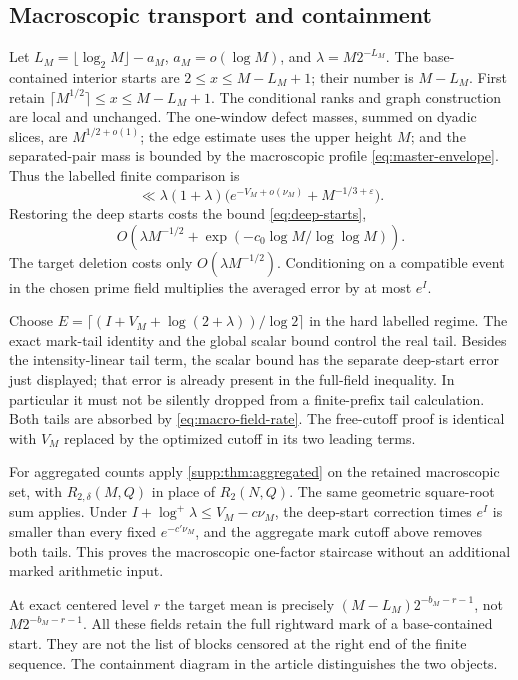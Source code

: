 \subsection{Macroscopic transport and containment}\label{supp:sec:macro-marked}
Let $L_M=\lfloor\log_2M\rfloor-a_M$, $a_M=o(\log M)$, and
$\lambda=M2^{-L_M}$. The base-contained interior starts are
$2\le x\le M-L_M+1$; their number is $M-L_M$.
First retain $\lceil M^{1/2}\rceil\le x\le M-L_M+1$.
The conditional ranks and graph construction are local and unchanged.
The one-window defect masses, summed on dyadic slices, are
$M^{1/2+o(1)}$; the edge estimate uses the upper height $M$; and the
separated-pair mass is bounded by the macroscopic profile
\eqref{eq:master-envelope}. Thus the labelled finite comparison is
\[
 \ll\lambda(1+\lambda)
             \bigl(e^{-V_M+o(\nu_M)}+M^{-1/3+\varepsilon}\bigr).
\]
Restoring the deep starts costs the bound \eqref{eq:deep-starts},
\[
 O\left(\lambda M^{-1/2}
             +\exp(-c_0\log M/\log\log M)\right).
\]
The target deletion costs only $O(\lambda M^{-1/2})$.
Conditioning on a compatible event in the chosen prime field multiplies
the averaged error by at most $e^I$.

Choose $E=\lceil(I+V_M+\log(2+\lambda))/\log2\rceil$ in the hard
labelled regime. The exact mark-tail identity and the global scalar
bound control the real tail. Besides the intensity-linear tail term,
the scalar bound has the separate deep-start error just displayed;
that error is already present in the full-field inequality. In
particular it must not be silently dropped from a finite-prefix tail
calculation. Both tails are absorbed by
\eqref{eq:macro-field-rate}. The free-cutoff proof is identical with
$V_M$ replaced by the optimized cutoff in its two leading terms.

For aggregated counts apply \cref{supp:thm:aggregated} on the retained
macroscopic set, with $R_{2,\delta}(M,Q)$ in place of $R_2(N,Q)$.
The same geometric square-root sum applies. Under
$I+\log^+\lambda\le V_M-c\nu_M$, the deep-start correction times
$e^I$ is smaller than every fixed $e^{-c'\nu_M}$, and the aggregate
mark cutoff above removes both tails. This proves the macroscopic
one-factor staircase without an additional marked arithmetic input.

At exact centered level $r$ the target mean is precisely
$(M-L_M)2^{-b_M-r-1}$, not $M2^{-b_M-r-1}$.
All these fields retain the full rightward mark of a base-contained
start. They are not the list of blocks censored at the right end of the
finite sequence. The containment diagram in the article distinguishes
the two objects.

